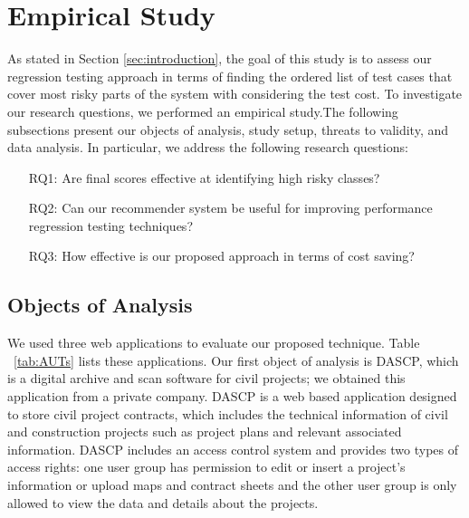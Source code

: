 \vspace*{4pt}
\section{Empirical Study}
\label{sec:study}

As stated in Section \ref{sec:introduction}, the goal of
this study is to assess our regression testing approach in terms 
of finding the ordered list of test cases that cover most risky parts 
of the system with considering the test cost.
To investigate our research questions, we performed
an empirical study.The following subsections present our objects of analysis, 
study setup, threats to validity, and data analysis.
In particular, we address the following research questions:

\begin{itemize}
\item[RQ1:] Are final scores effective at identifying high risky classes?
\item[RQ2:] Can our recommender system be useful for 
improving performance regression testing techniques?
\item[RQ3:] How effective is our proposed approach in terms of cost saving?
\end{itemize}

\noindent




\subsection{Objects of Analysis}
\label{sec:objects}

We used three web applications to evaluate our proposed technique. 
Table ~\ref{tab:AUTs} lists these applications.
Our first object of analysis is DASCP, which is 
a digital archive and scan software for civil projects;
we obtained this application from a private company. DASCP is
a web based application designed to store civil project contracts,
which includes the technical information of civil and construction
projects such as project plans and relevant associated information.
DASCP includes an access control system and provides two types
of access rights: one user group has permission to edit or insert
a project’s information or upload maps and contract sheets and the
other user group is only allowed to view the data and details about
the projects.

